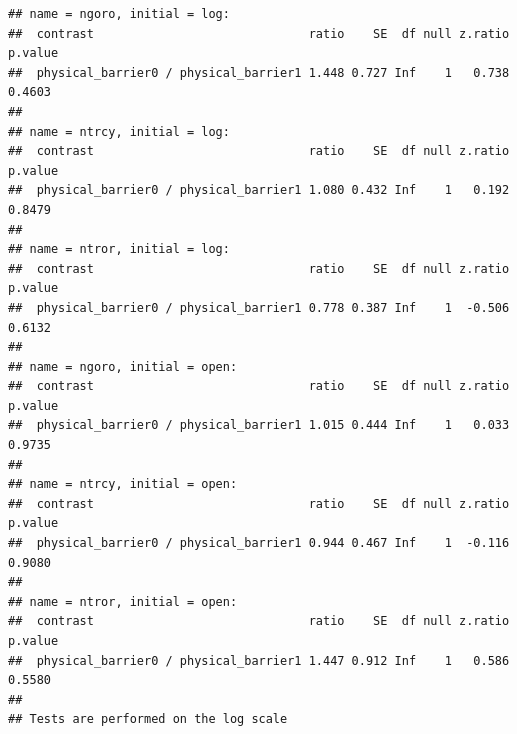 \documentclass[
]{article}
\begin{document}
\begin{verbatim}
## name = ngoro, initial = log:
##  contrast                              ratio    SE  df null z.ratio p.value
##  physical_barrier0 / physical_barrier1 1.448 0.727 Inf    1   0.738  0.4603
## 
## name = ntrcy, initial = log:
##  contrast                              ratio    SE  df null z.ratio p.value
##  physical_barrier0 / physical_barrier1 1.080 0.432 Inf    1   0.192  0.8479
## 
## name = ntror, initial = log:
##  contrast                              ratio    SE  df null z.ratio p.value
##  physical_barrier0 / physical_barrier1 0.778 0.387 Inf    1  -0.506  0.6132
## 
## name = ngoro, initial = open:
##  contrast                              ratio    SE  df null z.ratio p.value
##  physical_barrier0 / physical_barrier1 1.015 0.444 Inf    1   0.033  0.9735
## 
## name = ntrcy, initial = open:
##  contrast                              ratio    SE  df null z.ratio p.value
##  physical_barrier0 / physical_barrier1 0.944 0.467 Inf    1  -0.116  0.9080
## 
## name = ntror, initial = open:
##  contrast                              ratio    SE  df null z.ratio p.value
##  physical_barrier0 / physical_barrier1 1.447 0.912 Inf    1   0.586  0.5580
## 
## Tests are performed on the log scale
\end{verbatim}
\end{document}
